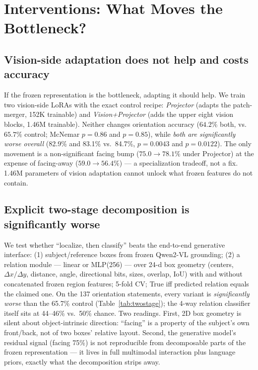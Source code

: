 \section{Interventions: What Moves the Bottleneck?}
\label{sec:interventions}

\subsection{Vision-side adaptation does not help and costs accuracy}
If the frozen representation is the bottleneck, adapting it should help. We
train two vision-side LoRAs with the exact control recipe: \emph{Projector}
(adapts the patch-merger, 152K trainable) and \emph{Vision+Projector} (adds the
upper eight vision blocks, 1.46M trainable). Neither changes orientation accuracy
($64.2\%$ both, vs.\ $65.7\%$ control; McNemar $p{=}0.86$ and $p{=}0.85$), while
\emph{both are significantly worse overall} (82.9\% and 83.1\% vs.\ 84.7\%,
$p{=}0.0043$ and $p{=}0.0122$). The only movement is a non-significant facing bump
($75.0\rightarrow78.1\%$ under Projector) at the expense of facing-away
($59.0\rightarrow56.4\%$) --- a specialization tradeoff, not a fix. 1.46M
parameters of vision adaptation cannot unlock what frozen features do not
contain.

\subsection{Explicit two-stage decomposition is significantly worse}
We test whether ``localize, then classify'' beats the end-to-end generative
interface: (1) subject/reference boxes from frozen Qwen2-VL grounding; (2) a
relation module --- linear or MLP(256) --- over 24-d box geometry
(centers, $\Delta x/\Delta y$, distance, angle, directional bits, sizes,
overlap, IoU) with and without concatenated frozen region features; 5-fold CV;
True iff predicted relation equals the claimed one. On the 137 orientation
statements, every variant is \emph{significantly worse} than the 65.7\% control
(Table~\ref{tab:twostage}); the 4-way relation classifier itself sits at
44--46\% vs.\ 50\% chance. Two readings. First, 2D box geometry is silent about
object-intrinsic direction: ``facing'' is a property of the subject's own
front/back, not of two boxes' relative layout. Second, the generative model's
residual signal (facing 75\%) is not reproducible from decomposable parts of the
frozen representation --- it lives in full multimodal interaction plus language
priors, exactly what the decomposition strips away.

